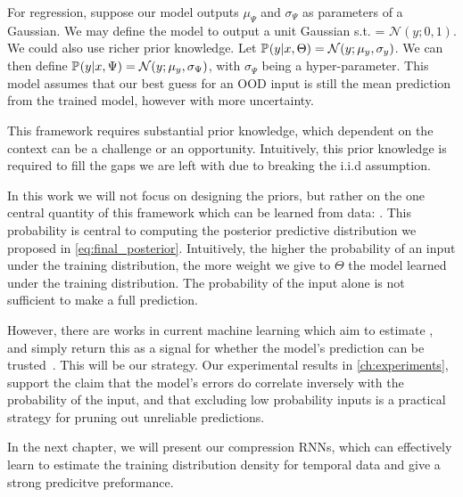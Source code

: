 \documentclass[../main.tex]{subfiles}
\begin{document}
For regression, suppose our model outputs $\mu_\Psi$ and $\sigma_\Psi$ as parameters of a Gaussian. We may define the model to output a unit Gaussian s.t.  = $\mathcal{N}(y; 0, 1)$. We could also use richer prior knowledge. Let $\mathbb{P}_{}(y|x, \Theta) = \mathcal{N}(y; \mu_y, \sigma_y)$. We can then define $\mathbb{P}_{}(y|x, \Psi) = \mathcal{N}(y; \mu_y, \sigma_\Psi)$, with $\sigma_\Psi$ being a hyper-parameter. This model assumes that our best guess for an OOD input is still the mean prediction from the trained model, however with more uncertainty. 

This framework requires substantial prior knowledge, which dependent on the context can be a challenge or an opportunity. Intuitively, this prior knowledge is required to fill the gaps we are left with due to breaking the i.i.d assumption. 

In this work we will not focus on designing the priors, but rather on the one central quantity of this framework which can be learned from data: . This probability is central to computing the posterior predictive distribution we proposed in \cref{eq:final_posterior}. Intuitively, the higher the probability of an input under the training distribution, the more weight we give to $\Theta$ the model learned under the training distribution. The probability of the input alone is not sufficient to make a full prediction.

However, there are works in current machine learning which aim to estimate , and simply return this as a signal for whether the model's prediction can be trusted~\citep{vasilev2018q, pidhorskyi2018generative}. This will be our strategy. Our experimental results in \cref{ch:experiments}, support the claim that the model's errors do correlate inversely with the probability of the input, and that excluding low probability inputs is a practical strategy for pruning out unreliable predictions. 

In the next chapter, we will present our compression RNNs, which can effectively learn to estimate the training distribution density for temporal data and give a strong predicitve preformance.  

  


\end{document}
